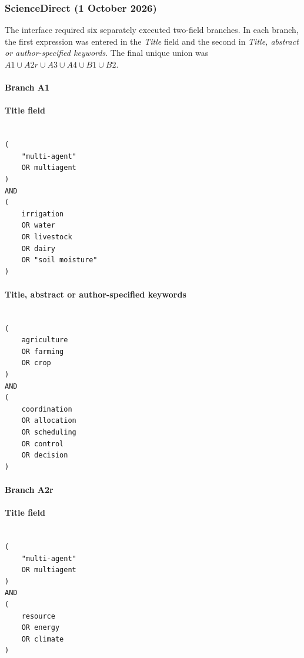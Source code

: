 \subsubsection{ScienceDirect (1 October 2026)}

The interface required six separately executed two-field branches. In each branch, the first expression was entered in the \emph{Title} field and the second in \emph{Title, abstract or author-specified keywords}. The final unique union was $A1 \cup A2r \cup A3 \cup A4 \cup B1 \cup B2$.

\paragraph{Branch A1}

\paragraph{Title field}

\begin{lstlisting}

(
    "multi-agent"
    OR multiagent
)
AND
(
    irrigation
    OR water
    OR livestock
    OR dairy
    OR "soil moisture"
)

\end{lstlisting}

\paragraph{Title, abstract or author-specified keywords}

\begin{lstlisting}

(
    agriculture
    OR farming
    OR crop
)
AND
(
    coordination
    OR allocation
    OR scheduling
    OR control
    OR decision
)

\end{lstlisting}

\paragraph{Branch A2r}

\paragraph{Title field}

\begin{lstlisting}

(
    "multi-agent"
    OR multiagent
)
AND
(
    resource
    OR energy
    OR climate
)

\end{lstlisting}

